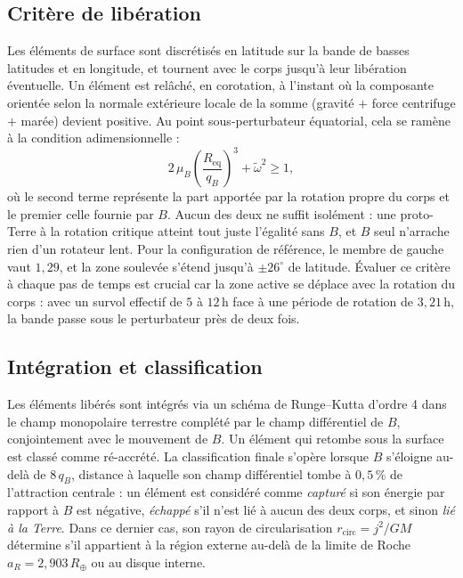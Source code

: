 \documentclass[11pt,a4paper]{article}
\begin{document}
\subsection{Critère de libération}
Les éléments de surface sont discrétisés en latitude sur la bande de basses latitudes et en longitude, et tournent avec le corps jusqu'à leur libération éventuelle. Un élément est relâché, en corotation, à l'instant où la composante orientée selon la normale extérieure locale de la somme (gravité $+$ force centrifuge $+$ marée) devient positive. Au point sous-perturbateur équatorial, cela se ramène à la condition adimensionnelle :
\begin{equation}
2\,\mu_B \left(\frac{R_{\mathrm{eq}}}{q_B}\right)^3 + \tilde{\omega}^2 \ge 1,
\end{equation}
où le second terme représente la part apportée par la rotation propre du corps et le premier celle fournie par $B$. Aucun des deux ne suffit isolément : une proto-Terre à la rotation critique atteint tout juste l'égalité sans $B$, et $B$ seul n'arrache rien d'un rotateur lent. Pour la configuration de référence, le membre de gauche vaut $1{,}29$, et la zone soulevée s'étend jusqu'à $\pm 26^\circ$ de latitude. Évaluer ce critère à chaque pas de temps est crucial car la zone active se déplace avec la rotation du corps : avec un survol effectif de $5$ à $12\,\mathrm{h}$ face à une période de rotation de $3{,}21\,\mathrm{h}$, la bande passe sous le perturbateur près de deux fois.

\subsection{Intégration et classification}
Les éléments libérés sont intégrés via un schéma de Runge--Kutta d'ordre 4 dans le champ monopolaire terrestre complété par le champ différentiel de $B$, conjointement avec le mouvement de $B$. Un élément qui retombe sous la surface est classé comme ré-accrété. La classification finale s'opère lorsque $B$ s'éloigne au-delà de $8\,q_B$, distance à laquelle son champ différentiel tombe à $0{,}5\,\%$ de l'attraction centrale : un élément est considéré comme \emph{capturé} si son énergie par rapport à $B$ est négative, \emph{échappé} s'il n'est lié à aucun des deux corps, et sinon \emph{lié à la Terre}. Dans ce dernier cas, son rayon de circularisation $r_{\mathrm{circ}} = j^2/GM$ détermine s'il appartient à la région externe au-delà de la limite de Roche $a_R = 2{,}903\,R_\oplus$ ou au disque interne.
\end{document}

